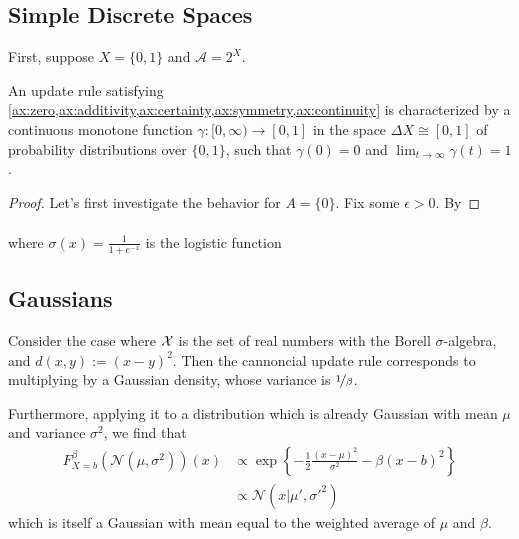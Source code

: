\documentclass{article}
\begin{document}
\subsection{Simple Discrete Spaces}
First, suppose $X = \{0,1\}$ and $\mathcal A = 2^X$.

\begin{claim}
An update rule satisfying
\cref{ax:zero,ax:additivity,ax:certainty,ax:symmetry,ax:continuity}
is characterized by a continuous monotone function
$\gamma : [0,\infty) \to [0,1]$ in the space $\Delta X \cong [0,1]$ of probability distributions over $\{0,1\}$, such that
$\gamma(0) = 0$ and $\lim_{t\to\infty}\gamma(t) = 1$.
\end{claim}
\begin{proof}
    Let's first investigate the behavior for $A = \{0\}$.
    Fix some $\epsilon > 0$.
    By 
\end{proof}

\begin{align*}
\end{align*}
where $\sigma(x) = \frac{1}{1 + e^{-x}}$ is the logistic function

\subsection{Gaussians}
Consider the case where $\mathcal X$ is the set of real numbers with the Borell $\sigma$-algebra, and $d(x,y) := (x-y)^2$.
Then the cannoncial update rule corresponds to multiplying by a Gaussian density, whose variance is $\nicefrac1\beta$.

Furthermore, applying it to a distribution which is already Gaussian with mean $\mu$ and variance $\sigma^2$, we find that
\begin{align*}
    F^{\beta}_{X=b}(\mathcal N(\mu, \sigma^2))(x) &\propto
        \exp\left\{ - \frac12 \frac{(x-\mu)^2}{ \sigma^2 } - \beta(x-b)^2\right\}
    \\&\propto \mathcal N(x| \mu', \sigma'^2)
\end{align*}
which is itself a Gaussian with mean equal to the weighted average of $\mu$ and $\beta$.
\end{document}
